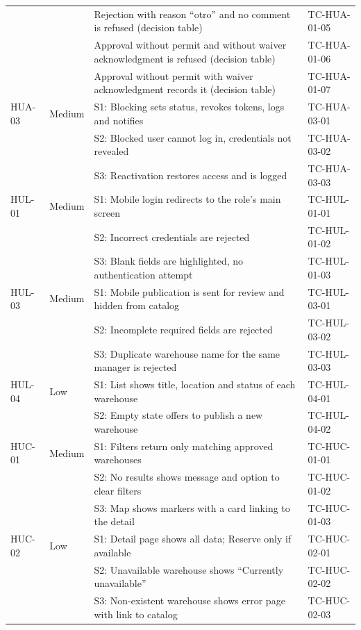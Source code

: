 \begin{longtable}{@{}L{1.5cm}L{1.5cm}L{8.3cm}L{2.7cm}@{}}
         &      & Rejection with reason ``otro'' and no comment is refused (decision table) & TC-HUA-01-05 \\
         &      & Approval without permit and without waiver acknowledgment is refused (decision table) & TC-HUA-01-06 \\
         &      & Approval without permit with waiver acknowledgment records it (decision table) & TC-HUA-01-07 \\
  HUA-03 & Medium & S1: Blocking sets status, revokes tokens, logs and notifies & TC-HUA-03-01 \\
         &      & S2: Blocked user cannot log in, credentials not revealed & TC-HUA-03-02 \\
         &      & S3: Reactivation restores access and is logged & TC-HUA-03-03 \\
  HUL-01 & Medium & S1: Mobile login redirects to the role's main screen & TC-HUL-01-01 \\
         &      & S2: Incorrect credentials are rejected & TC-HUL-01-02 \\
         &      & S3: Blank fields are highlighted, no authentication attempt & TC-HUL-01-03 \\
  HUL-03 & Medium & S1: Mobile publication is sent for review and hidden from catalog & TC-HUL-03-01 \\
         &      & S2: Incomplete required fields are rejected & TC-HUL-03-02 \\
         &      & S3: Duplicate warehouse name for the same manager is rejected & TC-HUL-03-03 \\
  HUL-04 & Low  & S1: List shows title, location and status of each warehouse & TC-HUL-04-01 \\
         &      & S2: Empty state offers to publish a new warehouse & TC-HUL-04-02 \\
  HUC-01 & Medium & S1: Filters return only matching approved warehouses & TC-HUC-01-01 \\
         &      & S2: No results shows message and option to clear filters & TC-HUC-01-02 \\
         &      & S3: Map shows markers with a card linking to the detail & TC-HUC-01-03 \\
  HUC-02 & Low  & S1: Detail page shows all data; Reserve only if available & TC-HUC-02-01 \\
         &      & S2: Unavailable warehouse shows ``Currently unavailable'' & TC-HUC-02-02 \\
         &      & S3: Non-existent warehouse shows error page with link to catalog & TC-HUC-02-03 \\

\end{longtable}
